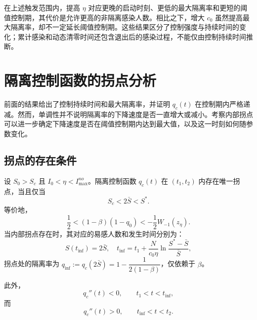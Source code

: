\documentclass[lang=cn,a4paper,newtx]{elegantpaper}
\numberwithin{equation}{section}
\theoremstyle{plain}
\newcommand{\qinf}{q_{\mathrm{inf}}}
\begin{document}
在上述触发范围内，提高 $\eta$ 对应更晚的启动时刻、更低的最大隔离率和更短的阈值控制期，其代价是允许更高的非隔离感染人数。相比之下，增大 $c_0$ 虽然提高最大隔离率，却不一定延长阈值控制期。这些结果区分了控制强度与持续时间的变化；累计感染和动态清零时间还包含退出后的感染过程，不能仅由控制持续时间推断。

\section{隔离控制函数的拐点分析}
\label{sec:s1:shape}
前面的结果给出了控制持续时间和最大隔离率，并证明 $q_c(t)$ 在控制期内严格递减。然而，单调性并不说明隔离率的下降速度是否一直增大或减小。考察内部拐点可以进一步确定下降速度是否在阈值控制期内达到最大值，以及这一时刻如何随参数变化。

\subsection{拐点的存在条件}
\begin{theorem}\label{thm:s1:inflection}
    设 $S_0>S_c$ 且 $I_0<\eta<I_{\max}^{no}$。隔离控制函数 $q_c(t)$ 在 $(t_1,t_2)$ 内存在唯一拐点，当且仅当
    \[
    S_c<2\bar S<S^*.
    \]
    等价地，
    \[
    \frac{1}{2}
    <(1-\beta)(1-q_0)
    <-\frac{1}{2}W_{-1}(z_\eta).
    \]
    当内部拐点存在时，其对应的易感人数和发生时间分别为：
    \[
    S(t_{\mathrm{inf}})=2\bar S,\quad
    t_{\mathrm{inf}}
    =
    t_1+\frac{N}{c_0\eta}\ln\frac{S^*-\bar S}{\bar S},
    \]
    拐点处的隔离率为 $\qinf:=q_c(2\bar S)=1-\dfrac{1}{2(1-\beta)}$，仅依赖于 $\beta$。

    此外，
    \[
    q_c''(t)<0,
    \qquad t_1<t<t_{\mathrm{inf}},
    \]
    而
    \[
    q_c''(t)>0,
    \qquad t_{\mathrm{inf}}<t<t_2.
    \]
\end{theorem}
\end{document}
